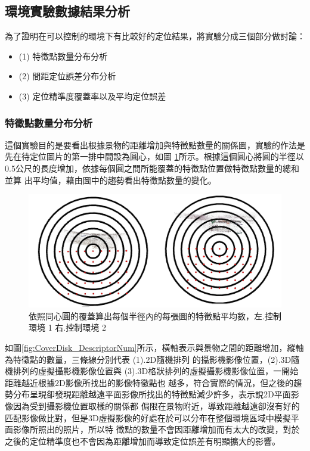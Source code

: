 

\subsection{環境實驗數據結果分析}

	為了證明在可以控制的環境下有比較好的定位結果，將實驗分成三個部分做討論：
	
\begin{itemize}
  \item (1) 特徵點數量分布分析
  \item (2) 間距定位誤差分布分析
  \item (3) 定位精準度覆蓋率以及平均定位誤差
\end{itemize}
		
\subsubsection{特徵點數量分布分析}

	這個實驗目的是要看出根據景物的距離增加與特徵點數量的關係圖，實驗的作法是先在待定位圖片的第一排中間設為圓心，如圖
\ref{fig:CoverDisk}所示。根據這個圓心將圓的半徑以 0.5公尺的長度增加，依據每個圓之間所能覆蓋的特徵點位置做特徵點數量的總和並算
出平均值，藉由圖中的趨勢看出特徵點數量的變化。

\begin{figure}
\begin{center}
  \includegraphics[width=1.0\textwidth]{figures/CoverDisk.jpg}
  \caption{依照同心圓的覆蓋算出每個半徑內的每張圖的特徵點平均數，左.控制環境 1 右.控制環境 2}
  \label{fig:CoverDisk}
\end{center}
\end{figure}
	
	如圖\ref{fig:CoverDisk_DescriptorNum}所示，橫軸表示與景物之間的距離增加，縱軸為特徵點的數量，三條線分別代表 (1).2D隨機排列
的攝影機影像位置，(2).3D隨機排列的虛擬攝影機影像位置與 (3).3D格狀排列的虛擬攝影機影像位置，一開始距離越近根據2D影像所找出的影像特徵點也
越多，符合實際的情況，但之後的趨勢分布呈現卻發現距離越遠平面影像所找出的特徵點減少許多，表示說2D平面影像因為受到攝影機位置取樣的關係都
侷限在景物附近，導致距離越遠卻沒有好的匹配影像做比對，但是3D虛擬影像的好處在於可以分布在整個環境區域中模擬平面影像所照出的照片，所以特
徵點的數量不會因距離增加而有太大的改變，對於之後的定位精準度也不會因為距離增加而導致定位誤差有明顯擴大的影響。
			
